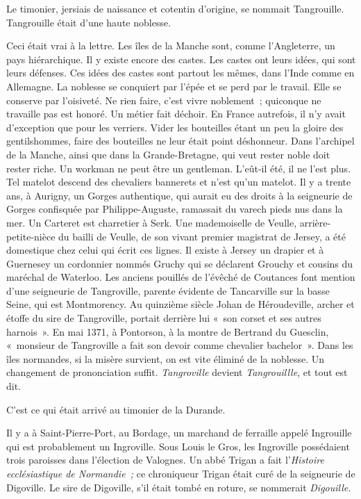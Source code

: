 \documentclass[french,twoside]{book} %
\begin{document}
Le timonier, jersiais de naissance et cotentin d’origine, se nommait Tangrouille. Tangrouille était d’une haute noblesse.\par
Ceci était vrai à la lettre. Les îles de la Manche sont, comme l’Angleterre, un pays hiérarchique. Il y existe encore des castes. Les castes ont leurs idées, qui sont leurs défenses. Ces idées des castes sont partout les mêmes, dans l’Inde comme en Allemagne. La noblesse se conquiert par l’épée et se perd par le travail. Elle se conserve par l’oisiveté. Ne rien faire, c’est vivre noblement ; quiconque ne travaille pas est honoré. Un métier fait déchoir. En France autrefois, il n’y avait d’exception que pour les verriers. Vider les bouteilles  étant un peu la gloire des gentilshommes, faire des bouteilles ne leur était point déshonneur. Dans l’archipel de la Manche, ainsi que dans la Grande-Bretagne, qui veut rester noble doit rester riche. Un workman ne peut être un gentleman. L’eût-il été, il ne l’est plus. Tel matelot descend des chevaliers bannerets et n’est qu’un matelot. Il y a trente ans, à Aurigny, un Gorges authentique, qui aurait eu des droits à la seigneurie de Gorges confisquée par Philippe-Auguste, ramassait du varech pieds nus dans la mer. Un Carteret est charretier à Serk. Une mademoiselle de Veulle, arrière-petite-nièce du bailli de Veulle, de son vivant premier magistrat de Jersey, a été domestique chez celui qui écrit ces lignes. Il existe à Jersey un drapier et à Guernesey un cordonnier nommés Gruchy qui se déclarent Grouchy et cousins du maréchal de Waterloo. Les anciens pouillés de l’évêché de Coutances font mention d’une seigneurie de Tangroville, parente évidente de Tancarville sur la basse Seine, qui est Montmorency. Au quinzième siècle Johan de Héroudeville, archer et étoffe du sire de Tangroville, portait derrière lui « son corset et ses autres harnois ». En mai 1371, à Pontorson, à la montre de Bertrand du Guesclin, « monsieur de Tangroville a fait son devoir comme chevalier bachelor ». Dans les îles normandes, si la misère survient, on est vite éliminé de la noblesse. Un changement de prononciation suffit. \emph{Tangroville} devient \emph{Tangrouillle}, et tout est dit.\par
C’est ce qui était arrivé au timonier de la Durande.\par
Il y a à Saint-Pierre-Port, au Bordage, un marchand  de ferraille appelé Ingrouille qui est probablement un Ingroville. Sous Louis le Gros, les Ingroville possédaient trois paroisses dans l’élection de Valognes. Un abbé Trigan a fait l’\emph{Histoire ecclésiastique de Normandie ;} ce chroniqueur Trigan était curé de la seigneurie de Digoville. Le sire de Digoville, s’il était tombé en roture, se nommerait \emph{Digouille.}\par
\end{document}

